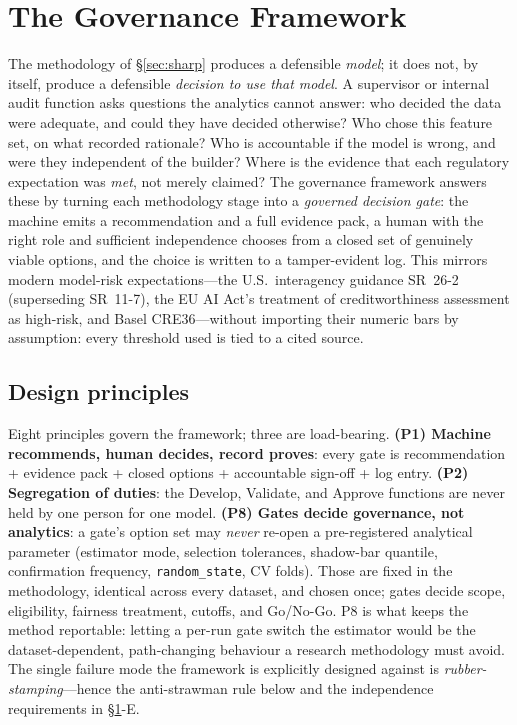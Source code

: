 \documentclass[9pt,journal]{IEEEtai}
\begin{document}
\section{The Governance Framework}\label{sec:aegis}
The methodology of \S\ref{sec:sharp} produces a defensible \emph{model}; it does not, by itself, produce a defensible
\emph{decision to use that model}. A supervisor or internal audit function asks questions the
analytics cannot answer: who decided the data were adequate, and could they have decided
otherwise? Who chose this feature set, on what recorded rationale? Who is accountable if the
model is wrong, and were they independent of the builder? Where is the evidence that each
regulatory expectation was \emph{met}, not merely claimed? The governance framework answers these
by turning each methodology stage into a
\emph{governed decision gate}: the machine emits a recommendation and a full evidence pack, a
human with the right role and sufficient independence chooses from a closed set of genuinely
viable options, and the choice is written to a tamper-evident log. This mirrors modern
model-risk expectations---the U.S.\ interagency guidance SR~26-2 (superseding SR~11-7), the EU
AI Act's treatment of creditworthiness assessment as high-risk, and Basel CRE36---without
importing their numeric bars by assumption: every threshold used is tied to a cited source.

\subsection{Design principles}
Eight principles govern the framework; three are load-bearing. \textbf{(P1) Machine recommends,
human decides, record proves}: every gate is recommendation + evidence pack + closed options +
accountable sign-off + log entry. \textbf{(P2) Segregation of duties}: the Develop, Validate,
and Approve functions are never held by one person for one model. \textbf{(P8) Gates decide
governance, not analytics}: a gate's option set may \emph{never} re-open a pre-registered
analytical parameter (estimator mode, selection tolerances, shadow-bar quantile, confirmation frequency,
\texttt{random\_state}, CV folds). Those are fixed in the methodology, identical across every
dataset, and chosen once; gates decide scope, eligibility, fairness treatment, cutoffs, and
Go/No-Go. P8 is what keeps the method reportable: letting a per-run gate switch the estimator
would be the dataset-dependent, path-changing behaviour a research methodology must avoid. The
single failure mode the framework is explicitly designed against is \emph{rubber-stamping}---hence the
anti-strawman rule below and the independence requirements in \S\ref{sec:aegis}-E.
\end{document}
